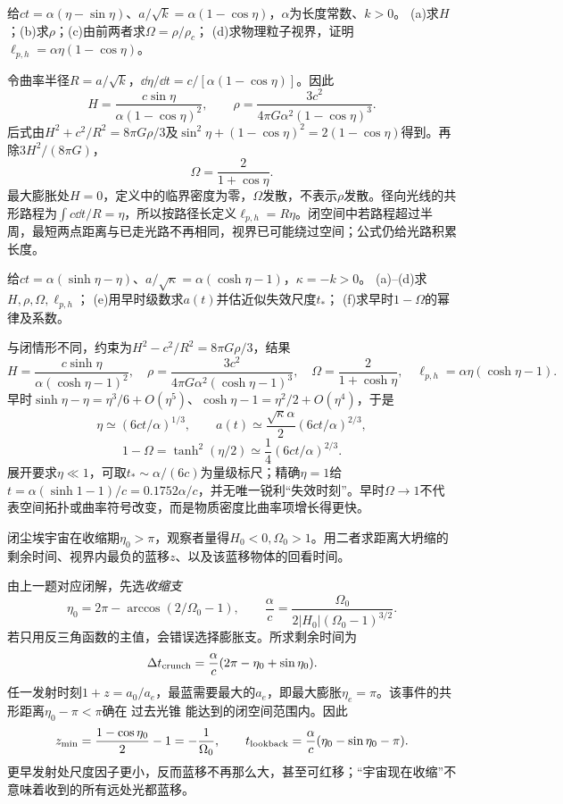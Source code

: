 \begin{exercise}
给$ct=\alpha(\eta-\sin\eta)$、$a/\sqrt{k}=\alpha(1-\cos\eta)$，$\alpha$为长度常数、$k>0$。
(a)求$H$；(b)求$\rho$；(c)由前两者求$\Omega=\rho/\rho_c$；
(d)求物理粒子视界，证明$\ell_{p,h}=\alpha\eta(1-\cos\eta)$。
\end{exercise}
\begin{solution}
令曲率半径$R=a/\sqrt{k}$，$\dd\eta/\dd t=c/[\alpha(1-\cos\eta)]$。因此
\[
 H=\frac{c\sin\eta}{\alpha(1-\cos\eta)^2},\qquad
 \rho=\frac{3c^2}{4\pi G\alpha^2(1-\cos\eta)^3}.
\]
后式由$H^2+c^2/R^2=8\pi G\rho/3$及$\sin^2\eta+(1-\cos\eta)^2=2(1-\cos\eta)$得到。再除$3H^2/(8\pi G)$，
\[
 \Omega=\frac{2}{1+\cos\eta}.
\]
最大膨胀处$H=0$，定义中的临界密度为零，$\Omega$发散，不表示$\rho$发散。径向光线的共形路程为$\int c\dd t/R=\eta$，所以按路径长定义$\ell_{p,h}=R\eta$。闭空间中若路程超过半周，最短两点距离与已走光路不再相同，视界已可能绕过空间；公式仍给光路积累长度。
\end{solution}

\begin{exercise}
给$ct=\alpha(\sinh\eta-\eta)$、$a/\sqrt{\kappa}=\alpha(\cosh\eta-1)$，$\kappa=-k>0$。
(a)--(d)求$H,\rho,\Omega,\ell_{p,h}$；
(e)用早时级数求$a(t)$并估近似失效尺度$t_*$；
(f)求早时$1-\Omega$的幂律及系数。
\end{exercise}
\begin{solution}
与闭情形不同，约束为$H^2-c^2/R^2=8\pi G\rho/3$，结果
\[
 H=\frac{c\sinh\eta}{\alpha(\cosh\eta-1)^2},\quad
 \rho=\frac{3c^2}{4\pi G\alpha^2(\cosh\eta-1)^3},\quad
 \Omega=\frac{2}{1+\cosh\eta},\quad
 \ell_{p,h}=\alpha\eta(\cosh\eta-1).
\]
早时$\sinh\eta-\eta=\eta^3/6+O(\eta^5)$、$\cosh\eta-1=\eta^2/2+O(\eta^4)$，于是
\[
 \eta\simeq(6ct/\alpha)^{1/3},\qquad
 a(t)\simeq\frac{\sqrt{\kappa}\alpha}{2}(6ct/\alpha)^{2/3},
\]
\[
 1-\Omega=\tanh^2(\eta/2)\simeq\frac14(6ct/\alpha)^{2/3}.
\]
展开要求$\eta\ll1$，可取$t_*\sim\alpha/(6c)$为量级标尺；精确$\eta=1$给$t=\alpha(\sinh1-1)/c=0.1752\alpha/c$，并无唯一锐利“失效时刻”。早时$\Omega\to1$不代表空间拓扑或曲率符号改变，而是物质密度比曲率项增长得更快。
\end{solution}

\begin{exercise}
闭尘埃宇宙在收缩期$\eta_0>\pi$，观察者量得$H_0<0,\Omega_0>1$。用二者求距离大坍缩的剩余时间、视界内最负的蓝移$z$、以及该蓝移物体的回看时间。
\end{exercise}
\begin{solution}
由上一题对应闭解，先选\emph{收缩支}
\[
 \eta_0=2\pi-\arccos(2/\Omega_0-1),\qquad
 \frac{\alpha}{c}=\frac{\Omega_0}{2|H_0|(\Omega_0-1)^{3/2}}.
\]
若只用反三角函数的主值，会错误选择膨胀支。所求剩余时间为
\[
 \Delta t_{\rm crunch}=\frac{\alpha}{c}(2\pi-\eta_0+\sin\eta_0).
\]
任一发射时刻$1+z=a_0/a_e$，最蓝需要最大的$a_e$，即最大膨胀$\eta_e=\pi$。该事件的共形距离$\eta_0-\pi<\pi$确在 过去光锥 能达到的闭空间范围内。因此
\[
 z_{\min}=\frac{1-\cos\eta_0}{2}-1=-\frac1{\Omega_0},\qquad
 t_{\rm lookback}=\frac{\alpha}{c}(\eta_0-\sin\eta_0-\pi).
\]
更早发射处尺度因子更小，反而蓝移不再那么大，甚至可红移；“宇宙现在收缩”不意味着收到的所有远处光都蓝移。
\end{solution}

